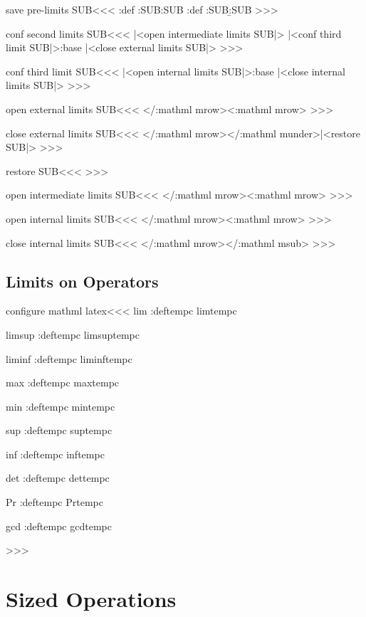 {{{{{{\<save pre-limits SUB\><<<
\def\pl:SUB{\Configure{SUB}}%
\expandafter\append:def
   \expandafter\pl:SUB\expandafter{\expandafter{\a:SUB}}%
\expandafter\append:def
   \expandafter\pl:SUB\expandafter{\expandafter{\b:SUB}}%
>>>

\<conf second limits SUB\><<<
   {|<open intermediate limits SUB|>\bgroup
    |<conf third limit SUB|>\trap:base}                 
   {\egroup|<close external limits SUB|>}%
>>>


\<conf third limit SUB\><<<
   {|<open internal limits SUB|>\bgroup \trap:base}
   {\egroup |<close internal limits SUB|>}%
>>>


\<open external limits SUB\><<<
%
\Tg</\a:mathml mrow>\Tg<\a:mathml mrow\Hnewline>%
>>>

\<close external limits SUB\><<<
\Tg</\a:mathml mrow>\TG</\a:mathml
              munder\Hnewline>\aftergroup|<restore SUB|>%
>>>

\<restore SUB\><<<
\pl:SUB >>>

\<open intermediate limits SUB\><<<
%
\Tg</\a:mathml mrow>\Tg<\a:mathml mrow\Hnewline>%
>>>

\<open internal limits SUB\><<<
%
\Tg</\a:mathml mrow>\Tg<\a:mathml mrow\Hnewline>%
>>>

\<close internal limits SUB\><<<
\Tg</\a:mathml mrow>\TG</\a:mathml msub\Hnewline>%
>>>

\subsection{Limits on Operators}


\<configure mathml latex\><<<
\def\:tempb#1{%
   \expandafter\let\expandafter\:tempc\csname #1\endcsname
   \append:def\:tempc{\limits}%
   \expandafter\HLet\csname #1\endcsname\:tempc
}
\:tempb{lim}
\:tempb{limsup}
\:tempb{liminf}
\:tempb{max}
\:tempb{min}
\:tempb{sup}
\:tempb{inf}
\:tempb{det}
\:tempb{Pr}
\:tempb{gcd}
>>>


\section{Sized Operations}

}}}}}}
